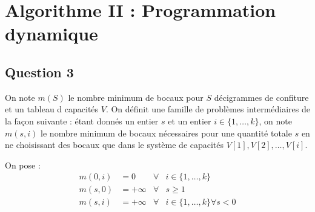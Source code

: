 \documentclass[12pt,a4paper]{article}
\begin{document}
\section{Algorithme II : Programmation dynamique}

\subsection*{Question 3}
On note $m(S)$ le nombre minimum de bocaux pour $S$ d\'ecigrammes de confiture et un tableau d capacit\'es $V$. On d\'efinit une famille de probl\`emes interm\'ediaires de la fa\c{c}on suivante : \'etant donn\'es un entier $s$ et un entier $i \in \{1, \dotsc, k\}$, on note $m(s,i)$ le nombre minimum de bocaux n\'ecessaires pour une quantit\'e totale $s$ en ne choisissant des bocaux que dans le syst\`eme de capacit\'es $V[1],V[2],\dotsc,V[i]$.

On pose :
\begin{align*}
 m(0,i) &= 0 & \forall & i \in \{1,\dotsc, k\} \\
 m(s,0) &= +\infty & \forall & s \geq 1 \\
 m(s,i) &= + \infty & \forall & i \in \{1,\dotsc,k\} \forall s < 0
\end{align*}
\end{document}
